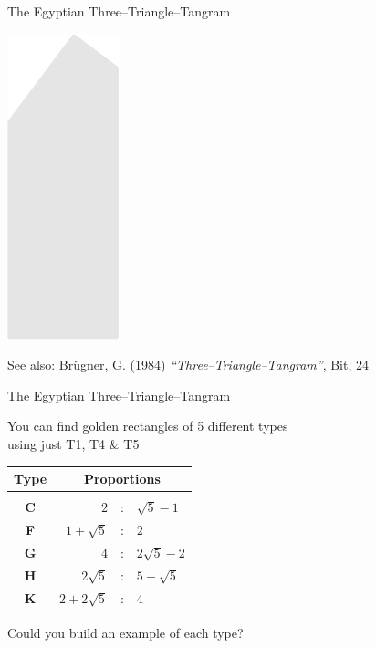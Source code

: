 \documentclass[14pt]{beamer}
\begin{document}
\begin{frame}{The Egyptian Three--Triangle--Tangram}
\begin{center}
            \includegraphics[scale=0.39]{figures/figure004k.pdf}\\

            \bigskip\medskip

            {\footnotesize See also: Brügner, G. (1984) \emph{``\href{https://doi.org/10.1007/BF02136037}{Three--Triangle--Tangram}''}, Bit, 24}
        \end{center}
    \end{frame}


    \begin{frame}{The Egyptian Three--Triangle--Tangram}
        \begin{center}
            You can find golden rectangles of 5 different types\\[0.5ex]using just T1, T4 \& T5

            \bigskip\bigskip

            {\small\begin{tabular}{c|rcl}
                \textbf{Type} & \multicolumn{3}{c}{\textbf{Proportions}} \\[0.5ex]\hline&&&\\[-1.5ex]
                \textbf{C} & $2$               &\!\!\!\!:\!\!\!\!& $\sqrt{5}\!-\!1$  \\
                \textbf{F} & $1\!+\!\sqrt{5}$  &\!\!\!\!:\!\!\!\!& $2$               \\
                \textbf{G} & $4$               &\!\!\!\!:\!\!\!\!& $2\sqrt{5}\!-\!2$ \\
                \textbf{H} & $2\sqrt{5}$       &\!\!\!\!:\!\!\!\!& $5\!-\!\sqrt{5}$  \\
                \textbf{K} & $2\!+\!2\sqrt{5}$ &\!\!\!\!:\!\!\!\!& $4$               \\
            \end{tabular}}

            \bigskip\bigskip

            Could you build an example of each type?
        \end{center}
    \end{frame}
\end{document}
